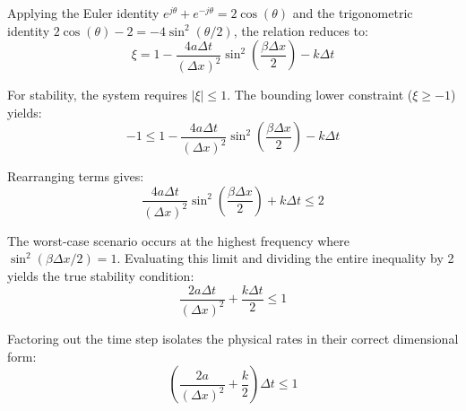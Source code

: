 Applying the Euler identity $e^{j \theta} + e^{-j \theta} = 2 \cos(\theta)$ and the trigonometric identity $2\cos(\theta) - 2 = -4 \sin^2(\theta/2)$, the relation reduces to:
\begin{equation}
\xi = 1 - \frac{4a \Delta t}{(\Delta x)^2} \sin^2\left(\frac{\beta \Delta x}{2}\right) - k \Delta t
\end{equation}

For stability, the system requires $|\xi| \le 1$. The bounding lower constraint ($\xi \ge -1$) yields:
\begin{equation}
-1 \le 1 - \frac{4a \Delta t}{(\Delta x)^2} \sin^2\left(\frac{\beta \Delta x}{2}\right) - k \Delta t
\end{equation}

Rearranging terms gives:
\begin{equation}
\frac{4a \Delta t}{(\Delta x)^2} \sin^2\left(\frac{\beta \Delta x}{2}\right) + k \Delta t \le 2
\end{equation}

The worst-case scenario occurs at the highest frequency where $\sin^2(\beta \Delta x / 2) = 1$. Evaluating this limit and dividing the entire inequality by 2 yields the true stability condition:
\begin{equation}
\frac{2a \Delta t}{(\Delta x)^2} + \frac{k \Delta t}{2} \le 1
\end{equation}

Factoring out the time step isolates the physical rates in their correct dimensional form:
\begin{equation}
\left( \frac{2a}{(\Delta x)^2} + \frac{k}{2} \right) \Delta t \le 1
\end{equation}
